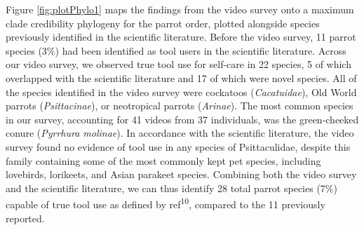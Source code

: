 \documentclass[
  man, donotrepeattitle,floatsintext]{apa6}
\begin{document}
Figure \ref{fig:plotPhylo1} maps the findings from the video survey onto a
maximum clade credibility phylogeny for the parrot order, plotted alongside
species previously identified in the scientific literature. Before the video
survey, 11 parrot species (3\%) had been identified as tool users in the
scientific literature. Across our video survey, we observed true tool use for self-care in
22
species, 5 of which overlapped with the scientific literature and
17
of which were novel species. All of the species identified in the video survey
were cockatoos (\emph{Cacatuidae}), Old World parrots (\emph{Psittacinae}), or neotropical
parrots (\emph{Arinae}). The most common species in our survey, accounting for
41 videos from
37
individuals, was the green-cheeked conure (\emph{Pyrrhura molinae}). In accordance
with the scientific literature, the video survey found no evidence of tool use
in any species of Psittaculidae, despite this family containing some of the most
commonly kept pet species, including lovebirds, lorikeets, and Asian parakeet
species. Combining both the video survey and the scientific literature, we can
thus identify 28 total parrot species (7\%) capable of true tool use as defined
by ref\textsuperscript{10}, compared to the 11 previously reported.
\end{document}
